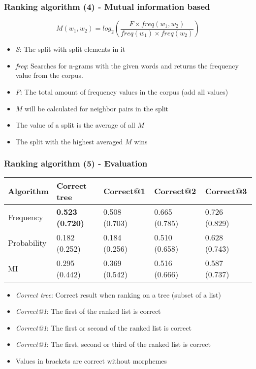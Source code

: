 \documentclass[accentcolor=tud9b, colorbacktitle, inverttitle]{tudbeamer}
\begin{document}
\begin{frame}
  \frametitle{Ranking algorithm (4) - Mutual information based \cite[Alfonseca et al.]{alf2008}}

  \begin{equation}
    M(w_1, w_2) = log_2(\frac{F \times freq(w_1, w_2)}{freq(w_1) \times freq(w_2)})
  \end{equation}

  \begin{itemize}
    \item \emph{S}: The split with split elements in it
    \item \emph{freq}: Searches for n-grams with the given words and returns the frequency value from the corpus.
    \item \emph{F}: The total amount of frequency values in the corpus (add all values)

    \vspace{10pt}
    \item $M$ will be calculated for neighbor pairs in the split
    \item The value of a split is the average of all $M$
    \item The split with the highest averaged $M$ wins
  \end{itemize}
\end{frame}

\begin{frame}
  \frametitle{Ranking algorithm (5) - Evaluation}

    \begin{tabular}{|l|l||l|l|l|}
      \hline
      \textbf{Algorithm} & \textbf{Correct tree} & \textbf{Correct@1} & \textbf{Correct@2} & \textbf{Correct@3} \\ \hline
      Frequency & \textbf{0.523  (0.720)} & 0.508 (0.703) & 0.665 (0.785) & 0.726 (0.829) \\ \hline
      Probability & 0.182  (0.252) & 0.184 (0.256) & 0.510 (0.658) & 0.628 (0.743) \\ \hline
      MI & 0.295 (0.442) & 0.369 (0.542) & 0.516 (0.666) & 0.587 (0.737) \\ \hline
    \end{tabular}

    \begin{itemize}
      \item \emph{Correct tree}: Correct result when ranking on a tree (subset of a list)
      \item \emph{Correct@1}: The first of the ranked list is correct
      \item \emph{Correct@1}: The first or second of the ranked list is correct
      \item \emph{Correct@1}: The first, second or third of the ranked list is correct
      \item Values in brackets are correct without morphemes
    \end{itemize}
\end{frame}
\end{document}
